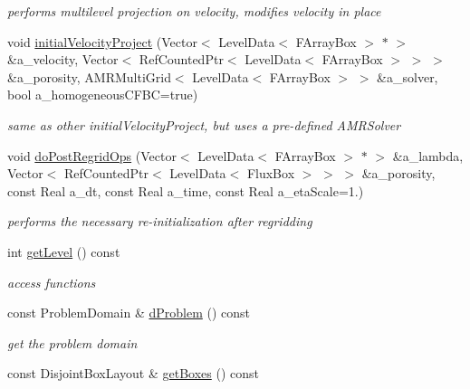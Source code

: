 \begin{DoxyCompactItemize}
\begin{DoxyCompactList}\small\item\em performs multilevel projection on velocity, modifies velocity in place \end{DoxyCompactList}\item 
\hypertarget{class_c_c_projector_a53aebcd829575db167dda5d0879ae213}{void \hyperlink{class_c_c_projector_a53aebcd829575db167dda5d0879ae213}{initial\-Velocity\-Project} (Vector$<$ Level\-Data$<$ F\-Array\-Box $>$ $\ast$ $>$ \&a\-\_\-velocity, Vector$<$ Ref\-Counted\-Ptr$<$ Level\-Data$<$ F\-Array\-Box $>$ $>$ $>$ \&a\-\_\-porosity, A\-M\-R\-Multi\-Grid$<$ Level\-Data$<$ F\-Array\-Box $>$ $>$ \&a\-\_\-solver, bool a\-\_\-homogeneous\-C\-F\-B\-C=true)}\label{class_c_c_projector_a53aebcd829575db167dda5d0879ae213}

\begin{DoxyCompactList}\small\item\em same as other initial\-Velocity\-Project, but uses a pre-\/defined A\-M\-R\-Solver \end{DoxyCompactList}\item 
\hypertarget{class_c_c_projector_afc5961c62c5fdcf5036c6d965ef85239}{void \hyperlink{class_c_c_projector_afc5961c62c5fdcf5036c6d965ef85239}{do\-Post\-Regrid\-Ops} (Vector$<$ Level\-Data$<$ F\-Array\-Box $>$ $\ast$ $>$ \&a\-\_\-lambda, Vector$<$ Ref\-Counted\-Ptr$<$ Level\-Data$<$ Flux\-Box $>$ $>$ $>$ \&a\-\_\-porosity, const Real a\-\_\-dt, const Real a\-\_\-time, const Real a\-\_\-eta\-Scale=1.)}\label{class_c_c_projector_afc5961c62c5fdcf5036c6d965ef85239}

\begin{DoxyCompactList}\small\item\em performs the necessary re-\/initialization after regridding \end{DoxyCompactList}\item 
int \hyperlink{class_c_c_projector_aa5303ddd85df578976393c38268896bd}{get\-Level} () const 
\begin{DoxyCompactList}\small\item\em access functions \end{DoxyCompactList}\item 
\hypertarget{class_c_c_projector_aa921cf122bae6bb141c6a210fdb96099}{const Problem\-Domain \& \hyperlink{class_c_c_projector_aa921cf122bae6bb141c6a210fdb96099}{d\-Problem} () const }\label{class_c_c_projector_aa921cf122bae6bb141c6a210fdb96099}

\begin{DoxyCompactList}\small\item\em get the problem domain \end{DoxyCompactList}\item 
\hypertarget{class_c_c_projector_a3499a327b37a1e76481cfd57dd04d5f8}{const Disjoint\-Box\-Layout \& \hyperlink{class_c_c_projector_a3499a327b37a1e76481cfd57dd04d5f8}{get\-Boxes} () const }\label{class_c_c_projector_a3499a327b37a1e76481cfd57dd04d5f8}


\end{DoxyCompactItemize}
